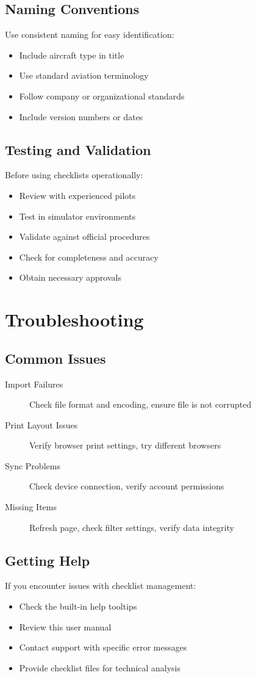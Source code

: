 \subsection{Naming Conventions}

Use consistent naming for easy identification:

\begin{itemize}
    \item Include aircraft type in title
    \item Use standard aviation terminology
    \item Follow company or organizational standards
    \item Include version numbers or dates
\end{itemize}

\subsection{Testing and Validation}

Before using checklists operationally:

\begin{itemize}
    \item Review with experienced pilots
    \item Test in simulator environments
    \item Validate against official procedures
    \item Check for completeness and accuracy
    \item Obtain necessary approvals
\end{itemize}

\section{Troubleshooting}

\subsection{Common Issues}

\begin{description}
    \item[Import Failures] Check file format and encoding, ensure file is not corrupted
    \item[Print Layout Issues] Verify browser print settings, try different browsers
    \item[Sync Problems] Check device connection, verify account permissions
    \item[Missing Items] Refresh page, check filter settings, verify data integrity
\end{description}

\subsection{Getting Help}

If you encounter issues with checklist management:

\begin{itemize}
    \item Check the built-in help tooltips
    \item Review this user manual
    \item Contact support with specific error messages
    \item Provide checklist files for technical analysis
\end{itemize}
